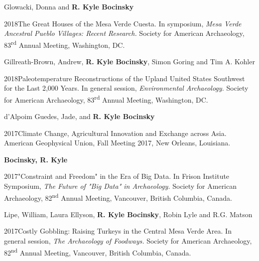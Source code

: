 Glowacki, Donna and {\bf R. Kyle Bocinsky}
\nopagebreak
\begin{list1}
\item[] 2018\hspace{.2cm}The Great Houses of the Mesa Verde Cuesta. In symposium, \emph{Mesa Verde Ancestral Pueblo Villages: Recent Research.} Society for American Archaeology, 83\textsuperscript{rd} Annual Meeting, Washington, DC.
\end{list1}

Gillreath-Brown, Andrew, {\bf R. Kyle Bocinsky}, Simon Goring and Tim A. Kohler
\nopagebreak
\begin{list1}
\item[] 2018\hspace{.2cm}Paleotemperature Reconstructions of the Upland United States Southwest for the Last 2,000 Years. In general session, \emph{Environmental Archaeology.} Society for American Archaeology, 83\textsuperscript{rd} Annual Meeting, Washington, DC.
\end{list1}

d'Alpoim Guedes, Jade, and {\bf R. Kyle Bocinsky}
\nopagebreak
\begin{list1}
\item[] 2017\hspace{.2cm}Climate Change, Agricultural Innovation and Exchange across Asia. American Geophysical Union, Fall Meeting 2017, New Orleans, Louisiana.
\end{list1}

{\bf Bocinsky, R. Kyle}
\nopagebreak
\begin{list1}
\item[] 2017\hspace{.2cm}"Constraint and Freedom" in the Era of Big Data. In Frison Institute Symposium, \emph{The Future of "Big Data" in Archaeology.} Society for American Archaeology, 82\textsuperscript{nd} Annual Meeting, Vancouver, British Columbia, Canada.
\end{list1}

Lipe, William, Laura Ellyson, {\bf R. Kyle Bocinsky}, Robin Lyle and R.G. Matson
\nopagebreak
\begin{list1}
\item[] 2017\hspace{.2cm}Costly Gobbling: Raising Turkeys in the Central Mesa Verde Area. In general session, \emph{The Archaeology of Foodways.} Society for American Archaeology, 82\textsuperscript{nd} Annual Meeting, Vancouver, British Columbia, Canada.
\end{list1}

